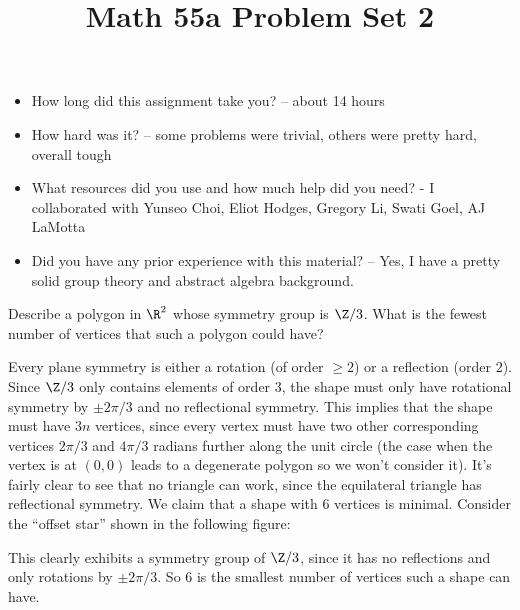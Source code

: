 \documentclass[11pt,letterpaper]{article}
\title{\textbf{Math 55a Problem Set 2}}
\begin{document}
\maketitle
\setcounter{page}{0}
\thispagestyle{empty}

\begin{itemize}
  \item How long did this assignment take you? -- about 14 hours
  \item How hard was it? -- some problems were trivial, others were pretty hard, overall tough
  \item What resources did you use and how much help did you need? - I collaborated with Yunseo Choi, Eliot Hodges, Gregory Li, Swati Goel, AJ LaMotta
  \item Did you have any prior experience with this material? -- Yes, I have a pretty solid group theory and abstract algebra background.
\end{itemize}

\pagebreak
\begin{problem}
  Describe a polygon in $\R^2$ whose symmetry group is $\Z /3$. What is the fewest number of vertices that such a polygon could have?
\end{problem}

Every plane symmetry is either a rotation (of order $\geq 2$) or a reflection (order $2$). Since $\Z /3$ only contains elements of order $3$, the shape must only have rotational symmetry by $\pm 2\pi /3$ and no reflectional symmetry. This implies that the shape must have $3n$ vertices, since every vertex must have two other corresponding vertices $2\pi /3$ and $4\pi /3$ radians further along the unit circle (the case when the vertex is at $(0,0)$ leads to a degenerate polygon so we won't consider it). It's fairly clear to see that no triangle can work, since the equilateral triangle has reflectional symmetry. We claim that a shape with $6$ vertices is minimal. Consider the ``offset star'' shown in the following figure:

\begin{center}
\end{center}
This clearly exhibits a symmetry group of $\Z /3$, since it has no reflections and only rotations by $\pm 2\pi /3$. So $6$ is the smallest number of vertices such a shape can have.
\end{document}
